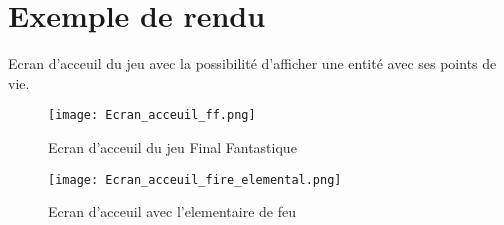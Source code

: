\documentclass[12pt,a4paper]{report}
\begin{document}
\section{Exemple de rendu}

Ecran d'acceuil du jeu avec la possibilité d'afficher une entité avec ses points de vie.

\begin{sidewaysfigure}[ht]
\caption{Ecran d'acceuil du jeu Final Fantastique}
\texttt{[image: Ecran\_acceuil\_ff.png]}
\end{sidewaysfigure}

\begin{sidewaysfigure}[ht]
\caption{Ecran d'acceuil avec l'elementaire de feu}
\texttt{[image: Ecran\_acceuil\_fire\_elemental.png]}
\end{sidewaysfigure}
\end{document}
